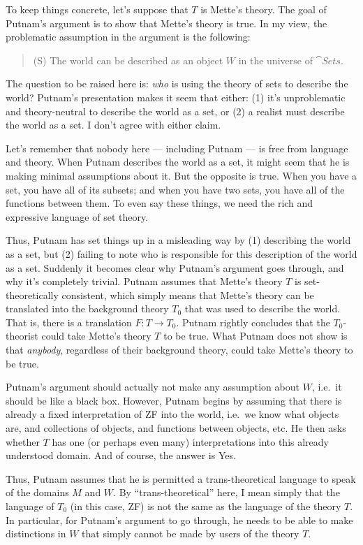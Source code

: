 To keep things concrete, let's suppose that $T$ is Mette's theory.
The goal of Putnam's argument is to show that Mette's theory is true.
In my view, the problematic assumption in the argument is the
following:
\begin{quote}
  (S) The world can be described as an object $W$ in the universe of
  $\cat{Sets}$.  \end{quote} The question to be raised here is: {\it
  who} is using the theory of sets to describe the world?  Putnam's
presentation makes it seem that either: (1) it's unproblematic and
theory-neutral to describe the world as a set, or (2) a realist must
describe the world as a set.  I don't agree with either claim.

Let's remember that nobody here --- including Putnam --- is free from
language and theory.  When Putnam describes the world as a set, it
might seem that he is making minimal assumptions about it.  But the
opposite is true.  When you have a set, you have all of its subsets;
and when you have two sets, you have all of the functions between
them.  To even say these things, we need the rich and expressive
language of set theory.

Thus, Putnam has set things up in a misleading way by (1) describing
the world as a set, but (2) failing to note who is responsible for
this description of the world as a set.  Suddenly it becomes clear why
Putnam's argument goes through, and why it's completely trivial.
Putnam assumes that Mette's theory $T$ is set-theoretically
consistent, which simply means that Mette's theory can be translated
into the background theory $T_0$ that was used to describe the world.
That is, there is a translation $F:T\to T_0$.  Putnam rightly
concludes that the $T_0$-theorist could take Mette's theory $T$ to be
true.  What Putnam does not show is that {\it anybody}, regardless of
their background theory, could take Mette's theory to be true.


Putnam's argument should actually not make any assumption about $W$,
i.e.\ it should be like a black box.  However, Putnam begins by
assuming that there is already a fixed interpretation of ZF into the
world, i.e.\ we know what objects are, and collections of objects, and
functions between objects, etc.  He then asks whether $T$ has one (or
perhaps even many) interpretations into this already understood
domain.  And of course, the answer is Yes.

Thus, Putnam assumes that he is permitted a trans-theoretical language
to speak of the domains $M$ and $W$.  By ``trans-theoretical'' here, I
mean simply that the language of $T_0$ (in this case, ZF) is not the
same as the language of the theory $T$.  In particular, for Putnam's
argument to go through, he needs to be able to make distinctions in
$W$ that simply cannot be made by users of the theory $T$.

